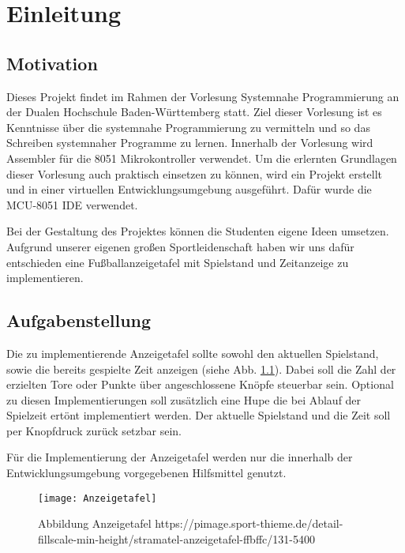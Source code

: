 \chapter{Einleitung}
\label{cha:Einleitung}


\section{Motivation}
Dieses Projekt findet im Rahmen der Vorlesung Systemnahe Programmierung an der Dualen Hochschule Baden-Württemberg statt. Ziel dieser Vorlesung ist es Kenntnisse über die systemnahe Programmierung zu vermitteln und so das Schreiben systemnaher Programme zu lernen. Innerhalb der Vorlesung wird Assembler für die 8051 Mikrokontroller verwendet. Um die erlernten Grundlagen dieser Vorlesung auch praktisch einsetzen zu können, wird ein Projekt erstellt und in einer virtuellen Entwicklungsumgebung ausgeführt. Dafür wurde die MCU-8051 IDE verwendet.  

Bei der Gestaltung des Projektes können die Studenten eigene Ideen umsetzen. Aufgrund unserer eigenen großen Sportleidenschaft haben wir uns dafür entschieden eine Fußballanzeigetafel mit Spielstand und Zeitanzeige zu implementieren. 


\section{Aufgabenstellung}
Die zu implementierende Anzeigetafel sollte sowohl den aktuellen Spielstand, sowie die bereits gespielte Zeit anzeigen (siehe Abb. \ref{fig:Anzeigetafel}). Dabei soll die Zahl der erzielten Tore oder Punkte über angeschlossene  Knöpfe steuerbar sein. Optional zu diesen Implementierungen soll zusätzlich eine Hupe die bei Ablauf der Spielzeit ertönt implementiert werden. Der aktuelle Spielstand und die Zeit soll per Knopfdruck zurück setzbar sein. 

Für die Implementierung der Anzeigetafel werden nur die innerhalb der Entwicklungsumgebung vorgegebenen Hilfsmittel genutzt. 

\begin{figure}[h]
	\centering
	\texttt{[image: Anzeigetafel]} 
	\caption{Abbildung Anzeigetafel  https://pimage.sport-thieme.de/detail-fillscale-min-height/stramatel-anzeigetafel-ffbffc/131-5400 }
	\label{fig:Anzeigetafel}
\end{figure}